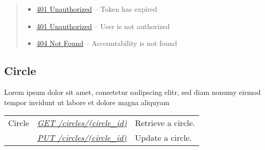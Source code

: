 \documentclass[letterpaper,10pt,english]{sphinxmanual}
\begin{document}
\begin{fulllineitems}
\begin{quote}
\begin{description}
\begin{itemize}
\item {} 
\href{http://www.w3.org/Protocols/rfc2616/rfc2616-sec10.html\#sec10.4.2}{401 Unauthorized} -- Token has expired

\item {} 
\href{http://www.w3.org/Protocols/rfc2616/rfc2616-sec10.html\#sec10.4.2}{401 Unauthorized} -- User is not authorized

\item {} 
\href{http://www.w3.org/Protocols/rfc2616/rfc2616-sec10.html\#sec10.4.5}{404 Not Found} -- Accountability is not found

\end{itemize}

\end{description}\end{quote}

\end{fulllineitems}



\subsection{Circle}
\label{\detokenize{resources/circle::doc}}\label{\detokenize{resources/circle:circle}}\label{\detokenize{resources/circle:id1}}
Lorem ipsum dolor sit amet, consetetur sadipscing elitr, sed diam nonumy eirmod tempor invidunt ut labore et dolore magna aliquyam

\noindent\begin{tabulary}{\linewidth}{|L|L|L|}
\hline
{}\relax &\relax &\relax \\
\hline
Circle
&
{\hyperref[\detokenize{resources/circle:get--circles-(circle_id)}]{\emph{GET /circles/(circle\_id)}}}
&
Retrieve a circle.
\\
\hline&
{\hyperref[\detokenize{resources/circle:put--circles-(circle_id)}]{\emph{PUT /circles/(circle\_id)}}}
&
Update a circle.
\\
\hline\end{tabulary}


\begin{DUlineblock}{0em}
\item[] 
\end{DUlineblock}
\end{document}
